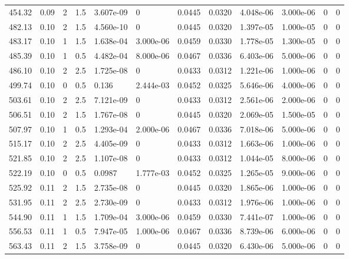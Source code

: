 \documentclass[preview]{standalone}
\begin{document}
{{{\begin{tabular}{L{1.2cm}C{1.2cm} C{0.3cm}C{0.5cm} C{1.4cm}C{1.4cm} C{1.4cm}C{1.4cm} C{1.6cm}C{1.6cm} C{1.6cm}C{1.6cm}}
  454.32  &  0.09  & 2     & 1.5 &  3.607e-09  & 0  &  0.0445&   0.0320& 4.048e-06 & 3.000e-06   &  0 & 0  \\ 
  482.13  &  0.10  & 2     & 1.5 &  4.560e-10  & 0  &  0.0445&   0.0320& 1.397e-05 & 1.000e-05   &  0 & 0  \\ 
  483.17  &  0.10  & 1     & 1.5 &  1.638e-04  & 3.000e-06  &  0.0459&   0.0330& 1.778e-05 & 1.300e-05   &  0 & 0  \\ 
  485.39  &  0.10  & 1     & 0.5 &  4.482e-04  & 8.000e-06  &  0.0467&   0.0336& 6.403e-06 & 5.000e-06   &  0 & 0  \\ 
  486.10  &  0.10  & 2     & 2.5 &  1.725e-08  & 0  &  0.0433&   0.0312& 1.221e-06 & 1.000e-06   &  0 & 0  \\ 
  499.74  &  0.10  & 0     & 0.5 &  0.136  & 2.444e-03  &  0.0452&   0.0325& 5.646e-06 & 4.000e-06   &  0 & 0  \\ 
  503.61  &  0.10  & 2     & 2.5 &  7.121e-09  & 0  &  0.0433&   0.0312& 2.561e-06 & 2.000e-06   &  0 & 0  \\ 
  506.51  &  0.10  & 2     & 1.5 &  1.767e-08  & 0  &  0.0445&   0.0320& 2.069e-05 & 1.500e-05   &  0 & 0  \\ 
  507.97  &  0.10  & 1     & 0.5 &  1.293e-04  & 2.000e-06  &  0.0467&   0.0336& 7.018e-06 & 5.000e-06   &  0 & 0  \\ 
  515.17  &  0.10  & 2     & 2.5 &  4.405e-09  & 0  &  0.0433&   0.0312& 1.663e-06 & 1.000e-06   &  0 & 0  \\ 
  521.85  &  0.10  & 2     & 2.5 &  1.107e-08  & 0  &  0.0433&   0.0312& 1.044e-05 & 8.000e-06   &  0 & 0  \\ 
  522.19  &  0.10  & 0     & 0.5 &  0.0987  & 1.777e-03  &  0.0452&   0.0325& 1.265e-05 & 9.000e-06   &  0 & 0  \\ 
  525.92  &  0.11  & 2     & 1.5 &  2.735e-08  & 0  &  0.0445&   0.0320& 1.865e-06 & 1.000e-06   &  0 & 0  \\ 
  531.95  &  0.11  & 2     & 2.5 &  2.730e-09  & 0  &  0.0433&   0.0312& 1.976e-06 & 1.000e-06   &  0 & 0  \\ 
  544.90  &  0.11  & 1     & 1.5 &  1.709e-04  & 3.000e-06  &  0.0459&   0.0330& 7.441e-07 & 1.000e-06   &  0 & 0  \\ 
  556.53  &  0.11  & 1     & 0.5 &  7.947e-05  & 1.000e-06  &  0.0467&   0.0336& 8.739e-06 & 6.000e-06   &  0 & 0  \\ 
  563.43  &  0.11  & 2     & 1.5 &  3.758e-09  & 0  &  0.0445&   0.0320& 6.430e-06 & 5.000e-06   &  0 & 0  \\ 

\end{tabular}}}}
\end{document}
